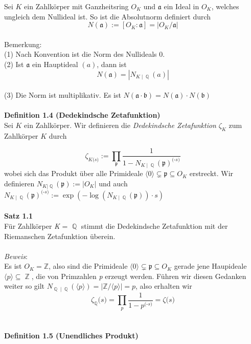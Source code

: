 \documentclass[10pt,a4paper]{article}
\DeclareMathOperator{\Q}{\mathbb{Q}}
\DeclareMathOperator{\Z}{\mathbb{Z}}
\begin{document}
Sei $\textit{K}$ ein Zahlkörper mit Ganzheitsring $O_{K}$ und $\mathfrak{a}$ ein Ideal in $O_{K}$, welches ungleich dem Nullideal ist. So ist die Absolutnorm definiert durch $$N(\mathfrak{a}) := [O_{K} : \mathfrak{a} ] = \vert O_{K} / \mathfrak{a} \vert $$
\\
Bemerkung: 
\\
(1) Nach Konvention ist die Norm des Nullideals 0.
\\
(2) Ist $\mathfrak{a}$ ein Hauptideal $(a)$, dann ist $$N(\mathfrak{a}) = |N_{K\mid \Q}(a)|$$
\\
(3) Die Norm ist multiplikativ. Es ist $N(\mathfrak{a}\cdot \mathfrak{b}) = N(\mathfrak{a})\cdot N(\mathfrak{b})$
\\
\\
\textbf{Definition 1.4 (Dedekindsche Zetafunktion)}
\\
 
Sei $\textit{K}$ ein Zahlkörper. Wir definieren die \textit{Dedekindsche Zetafunktion} \textit{$\zeta_{\textit{K}}$} zum Zahlkörper $\textit{K}$ durch
	
$$\zeta_{\textit{K} \textit{(s)}}:= \prod_{\mathfrak{p}}\frac{1}{1- N_{\textit{K}\mid\Q}(\mathfrak{p})^\textit{(-s)}}$$
wobei sich das Produkt über alle Primideale $\langle0\rangle\subsetneq \mathfrak{p} \subseteq O_{\textit{K}}$ erstreckt. Wir definieren $N_{\textit{K}|\Q}(\mathfrak{p}) := | O_{\textit{K}}|$ und auch $N_{\textit{K}\mid\Q}(\mathfrak{p})^\textit{(-s)}:=\exp(-\log(N_{\textit{K}\mid\Q}(\mathfrak{p}))\cdot \textit{s})$
\\
\\
\textbf{Satz 1.1}
\\

Für Zahlkörper \textit{K} = $\Q$ stimmt die Dedekindsche Zetafunktion mit der Riemanschen Zetafunktion überein.
\\
\\
\textit{Beweis}:
\\
Es ist $O_\textit{K} = \mathbb{Z}$, also sind die Primideale $\langle0\rangle\subsetneq \mathfrak{p} \subseteq O_{\textit{K}}$ gerade jene Haupideale $\langle \textit{p}\rangle\subseteq\Z$, die von Primzahlen \textit{p} erzeugt werden. Führen wir diesen Gedanken weiter so gilt $N_{\Q\mid\Q}(\langle \textit{p}\rangle) = | \mathbb{Z}/\langle \textit{p}\rangle| = \textit{p}$, also erhalten wir  $$\zeta_{\Q} \textit{(s)}= \prod_{\textit{p}} \frac{1}{1-\textit{p}^\textit{(-s)}} = \zeta \textit{(s)} $$
\\
\\
\textbf{Definition 1.5 (Unendliches Produkt)}
\\
\end{document}
